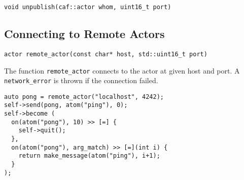 \begin{lstlisting}
void unpublish(caf::actor whom, uint16_t port)
\end{lstlisting}

\clearpage
\subsection{Connecting to Remote Actors}

\begin{lstlisting}
actor remote_actor(const char* host, std::uint16_t port)
\end{lstlisting}

The function \lstinline^remote_actor^ connects to the actor at given host and port.
A \lstinline^network_error^ is thrown if the connection failed.

\begin{lstlisting}
auto pong = remote_actor("localhost", 4242);
self->send(pong, atom("ping"), 0);
self->become (
  on(atom("pong"), 10) >> [=] {
    self->quit();
  },
  on(atom("pong"), arg_match) >> [=](int i) {
    return make_message(atom("ping"), i+1);
  }
);
\end{lstlisting}
